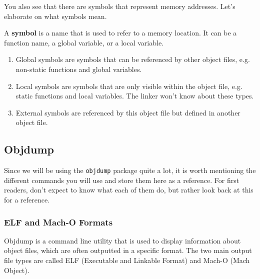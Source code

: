     \begin{example}
      
    \end{example}

    You also see that there are symbols that represent memory addresses. Let's elaborate on what symbols mean. 

    \begin{definition}[Symbol]
      A \textbf{symbol} is a name that is used to refer to a memory location. It can be a function name, a global variable, or a local variable. 
      \begin{enumerate}
        \item Global symbols are symbols that can be referenced by other object files, e.g. non-static functions and global variables. 
        \item Local symbols are symbols that are only visible within the object file, e.g. static functions and local variables. The linker won't know about these types. 
        \item External symbols are referenced by this object file but defined in another object file. 
      \end{enumerate}
    \end{definition}

  \subsection{Objdump} 

    Since we will be using the \texttt{objdump} package quite a lot, it is worth mentioning the different commands you will use and store them here as a reference. For first readers, don't expect to know what each of them do, but rather look back at this for a reference. 

    \subsubsection{ELF and Mach-O Formats}

      Objdump is a command line utility that is used to display information about object files, which are often outputted in a specific format. The two main output file types are called ELF (Executable and Linkable Format) and Mach-O (Mach Object). 

